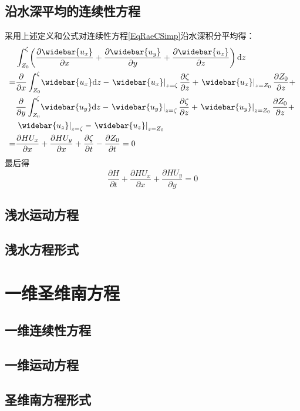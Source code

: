 \subsection{沿水深平均的连续性方程}
采用上述定义和公式对连续性方程\eqref{EqRaeCSimp}沿水深积分平均得：
\begin{equation*}
  \begin{aligned}
  &\int_{Z_{0}}^{\zeta}\!
  \left(
  \frac{\partial \widebar{u_{x}}}{\partial x} +
  \frac{\partial \widebar{u_{y}}}{\partial y} +
  \frac{\partial \widebar{u_{z}}}{\partial z} 
  \right)
  \mathrm{d}z
  \\
  =&
  \frac{\partial}{\partial x}
  \int_{Z_{0}}^{\zeta}\!
  \widebar{u_{x}}
  \mathrm{d}z
  -
  \left.\widebar{u_{x}}\right|_{z=\zeta}
    \frac{\partial\zeta}{\partial z}
  +
  \left.\widebar{u_{x}}\right|_{z=Z_{0}}
    \frac{\partial Z_{0}}{\partial z}
   + \\
  &
  \frac{\partial}{\partial y}
  \int_{Z_{0}}^{\zeta}\!
  \widebar{u_{y}}
  \mathrm{d}z
  -
  \left.\widebar{u_{y}}\right|_{z=\zeta}
    \frac{\partial\zeta}{\partial z}
  +
  \left.\widebar{u_{y}}\right|_{z=Z_{0}}
    \frac{\partial Z_{0}}{\partial z}
    + \\
  &
  \left.\widebar{u_{z}}\right|_{z=\zeta}
    -
    \left.\widebar{u_{z}}\right|_{z=Z_{0}}
      \\
  =&
  \frac{\partial HU_{x}}{\partial x} +
  \frac{\partial HU_{y}}{\partial x} +
  \frac{\partial \zeta}{\partial t} -
  \frac{\partial Z_{0}}{\partial t}
  =
  0
  \end{aligned}
\end{equation*}
最后得
\begin{equation}
  \frac{\partial H}{\partial t} +
  \frac{\partial HU_{x}}{\partial x} +
  \frac{\partial HU_{y}}{\partial y}
  =
  0
\end{equation}

\subsection{浅水运动方程}

\subsection{浅水方程形式}

\section{一维圣维南方程}

\subsection{一维连续性方程}

\subsection{一维运动方程}

\subsection{圣维南方程形式}
